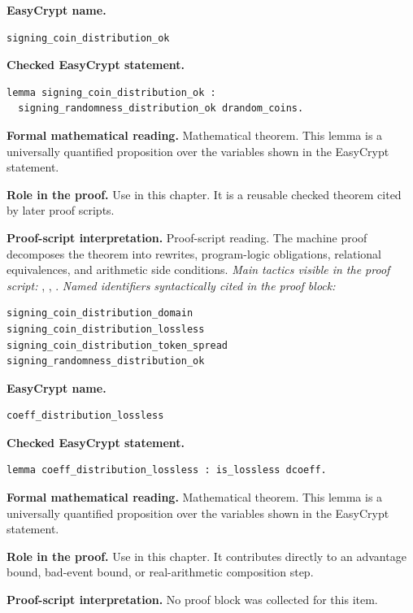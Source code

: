 \begin{formaltheorem}
\noindent\textbf{EasyCrypt name.}
\begin{lstlisting}[language=EasyCrypt,basicstyle=\ttfamily\scriptsize]
signing_coin_distribution_ok
\end{lstlisting}
\noindent\textbf{Checked EasyCrypt statement.}
\begin{lstlisting}[language=EasyCrypt,basicstyle=\ttfamily\scriptsize]
lemma signing_coin_distribution_ok :
  signing_randomness_distribution_ok drandom_coins.
\end{lstlisting}
\noindent\textbf{Formal mathematical reading.}
Mathematical theorem. This lemma is a universally quantified proposition over the variables shown in the EasyCrypt statement.

\noindent\textbf{Role in the proof.}
Use in this chapter. It is a reusable checked theorem cited by later proof scripts.

\noindent\textbf{Proof-script interpretation.}
Proof-script reading. The machine proof decomposes the theorem into rewrites, program-logic obligations, relational equivalences, and arithmetic side conditions.
\emph{Main tactics visible in the proof script:} , , .
\emph{Named identifiers syntactically cited in the proof block:}
\begin{lstlisting}[language=EasyCrypt,basicstyle=\ttfamily\scriptsize]
signing_coin_distribution_domain
signing_coin_distribution_lossless
signing_coin_distribution_token_spread
signing_randomness_distribution_ok
\end{lstlisting}

\end{formaltheorem}

\begin{formaltheorem}
\noindent\textbf{EasyCrypt name.}
\begin{lstlisting}[language=EasyCrypt,basicstyle=\ttfamily\scriptsize]
coeff_distribution_lossless
\end{lstlisting}
\noindent\textbf{Checked EasyCrypt statement.}
\begin{lstlisting}[language=EasyCrypt,basicstyle=\ttfamily\scriptsize]
lemma coeff_distribution_lossless : is_lossless dcoeff.
\end{lstlisting}
\noindent\textbf{Formal mathematical reading.}
Mathematical theorem. This lemma is a universally quantified proposition over the variables shown in the EasyCrypt statement.

\noindent\textbf{Role in the proof.}
Use in this chapter. It contributes directly to an advantage bound, bad-event bound, or real-arithmetic composition step.

\noindent\textbf{Proof-script interpretation.}
No proof block was collected for this item.

\end{formaltheorem}

